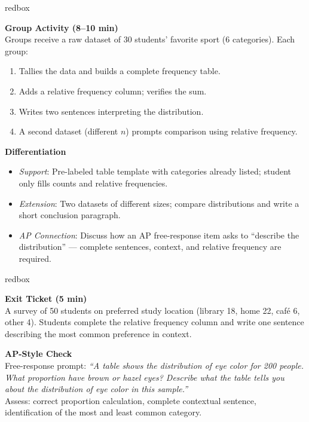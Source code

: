 \documentclass[10pt]{article}
\begin{document}
\begin{skillbox}{redbox}
\begin{minipage}[t]{0.48\linewidth}
    \textbf{Group Activity (8--10 min)}\\
    Groups receive a raw dataset of 30 students' favorite sport (6 categories).
    Each group:
    \begin{enumerate}
        \item Tallies the data and builds a complete frequency table.
        \item Adds a relative frequency column; verifies the sum.
        \item Writes two sentences interpreting the distribution.
        \item A second dataset (different $n$) prompts comparison using relative
              frequency.
    \end{enumerate}
\end{minipage}
\hfill
\begin{minipage}[t]{0.48\linewidth}
    \textbf{Differentiation}
    \begin{itemize}
        \item \textit{Support}: Pre-labeled table template with categories already
              listed; student only fills counts and relative frequencies.
        \item \textit{Extension}: Two datasets of different sizes; compare
              distributions and write a short conclusion paragraph.
        \item \textit{AP Connection}: Discuss how an AP free-response item asks to
              ``describe the distribution'' --- complete sentences, context, and
              relative frequency are required.
    \end{itemize}
\end{minipage}
\end{skillbox}

\begin{skillbox}{redbox}
\begin{minipage}[t]{0.48\linewidth}
    \textbf{Exit Ticket (5 min)}\\
    A survey of 50 students on preferred study location (library 18, home 22,
    caf\'{e} 6, other 4). Students complete the relative frequency column and write
    one sentence describing the most common preference in context.
\end{minipage}
\hfill
\begin{minipage}[t]{0.48\linewidth}
    \textbf{AP-Style Check}\\
    Free-response prompt: \textit{``A table shows the distribution of eye color for
    200 people. What proportion have brown or hazel eyes? Describe what the table
    tells you about the distribution of eye color in this sample.''}\\[4pt]
    Assess: correct proportion calculation, complete contextual sentence,
    identification of the most and least common category.
\end{minipage}
\end{skillbox}
\end{document}

